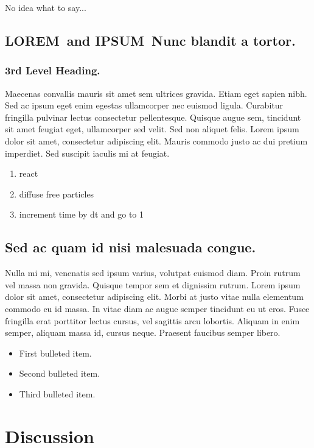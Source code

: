 \documentclass[10pt,letterpaper]{article}
\newcommand{\lorem}{{\bf LOREM}}
\newcommand{\ipsum}{{\bf IPSUM}}
\begin{document}
No idea what to say...

\subsection*{\lorem\ and \ipsum\ Nunc blandit a tortor.}
\subsubsection*{3rd Level Heading.} 

Maecenas convallis mauris sit amet sem ultrices gravida. Etiam eget sapien nibh. Sed ac ipsum eget enim egestas ullamcorper nec euismod ligula. Curabitur fringilla pulvinar lectus consectetur pellentesque. Quisque augue sem, tincidunt sit amet feugiat eget, ullamcorper sed velit. Sed non aliquet felis. Lorem ipsum dolor sit amet, consectetur adipiscing elit. Mauris commodo justo ac dui pretium imperdiet. Sed suscipit iaculis mi at feugiat. 

\begin{enumerate}
	\item{react}
	\item{diffuse free particles}
	\item{increment time by dt and go to 1}
\end{enumerate}

\subsection*{Sed ac quam id nisi malesuada congue.}

Nulla mi mi, venenatis sed ipsum varius, volutpat euismod diam. Proin rutrum vel massa non gravida. Quisque tempor sem et dignissim rutrum. Lorem ipsum dolor sit amet, consectetur adipiscing elit. Morbi at justo vitae nulla elementum commodo eu id massa. In vitae diam ac augue semper tincidunt eu ut eros. Fusce fringilla erat porttitor lectus cursus, vel sagittis arcu lobortis. Aliquam in enim semper, aliquam massa id, cursus neque. Praesent faucibus semper libero.

\begin{itemize}
	\item First bulleted item.
	\item Second bulleted item.
	\item Third bulleted item.
\end{itemize}

\section*{Discussion}
\end{document}
